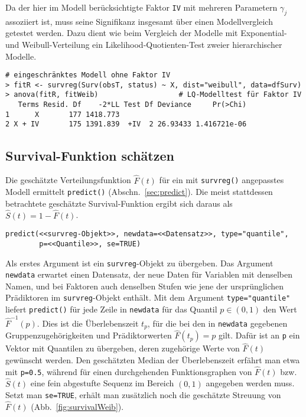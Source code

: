 Da der hier im Modell berücksichtigte Faktor \lstinline!IV! mit mehreren Parametern $\gamma_{j}$ assoziiert ist, muss seine Signifikanz insgesamt über einen Modellvergleich getestet werden. Dazu dient wie beim Vergleich der Modelle mit Exponential- und Weibull-Verteilung ein Likelihood-Quotienten-Test zweier hierarchischer Modelle.
\begin{lstlisting}
# eingeschränktes Modell ohne Faktor IV
> fitR <- survreg(Surv(obsT, status) ~ X, dist="weibull", data=dfSurv)
> anova(fitR, fitWeib)                   # LQ-Modelltest für Faktor IV
   Terms Resid. Df    -2*LL Test Df Deviance     Pr(>Chi)
1      X       177 1418.773
2 X + IV       175 1391.839  +IV  2 26.93433 1.416721e-06
\end{lstlisting}

\subsection{Survival-Funktion schätzen}

Die geschätzte Verteilungsfunktion $\hat{F}(t)$ für ein mit \lstinline!survreg()! angepasstes Modell ermittelt \lstinline!predict()! (Abschn.\ \ref{sec:predict}). Die meist stattdessen betrachtete geschätzte Survival-Funktion ergibt sich daraus als $\hat{S}(t) = 1-\hat{F}(t)$.
\begin{lstlisting}
predict(<<survreg-Objekt>>, newdata=<<Datensatz>>, type="quantile",
        p=<<Quantile>>, se=TRUE)
\end{lstlisting}

Als erstes Argument ist ein \lstinline!survreg!-Objekt zu übergeben. Das Argument \lstinline!newdata! erwartet einen Datensatz, der neue Daten für Variablen mit denselben Namen, und bei Faktoren auch denselben Stufen wie jene der ursprünglichen Prädiktoren im \lstinline!survreg!-Objekt enthält. Mit dem Argument \lstinline!type="quantile"! liefert \lstinline!predict()! für jede Zeile in \lstinline!newdata! für das Quantil $p \in (0, 1)$ den Wert $\hat{F}^{-1}(p)$. Dies ist die Überlebenszeit $t_{p}$, für die bei den in \lstinline!newdata! gegebenen Gruppenzugehörigkeiten und Prädiktorwerten $\hat{F}(t_{p}) = p$ gilt. Dafür ist an \lstinline!p! ein Vektor mit Quantilen zu übergeben, deren zugehörige Werte von $\hat{F}(t)$ gewünscht werden. Den geschätzten Median der Überlebenszeit erfährt man etwa mit \lstinline!p=0.5!, während für einen durchgehenden Funktionsgraphen von $\hat{F}(t)$ bzw. $\hat{S}(t)$ eine fein abgestufte Sequenz im Bereich $(0, 1)$ angegeben werden muss. Setzt man \lstinline!se=TRUE!, erhält man zusätzlich noch die geschätzte Streuung von $\hat{F}(t)$ (Abb.\ \ref{fig:survivalWeib}).

